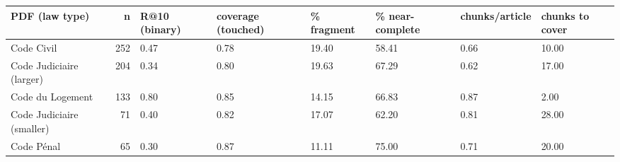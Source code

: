 \begin{tabular}{lrllllll}
\toprule
PDF (law type) & n & R@10 (binary) & coverage (touched) & \% fragment & \% near-complete & chunks/article & chunks to cover \\
\midrule
Code Civil & 252 & 0.47 & 0.78 & 19.40 & 58.41 & 0.66 & 10.00 \\
Code Judiciaire (larger) & 204 & 0.34 & 0.80 & 19.63 & 67.29 & 0.62 & 17.00 \\
Code du Logement & 133 & 0.80 & 0.85 & 14.15 & 66.83 & 0.87 & 2.00 \\
Code Judiciaire (smaller) & 71 & 0.40 & 0.82 & 17.07 & 62.20 & 0.81 & 28.00 \\
Code Pénal & 65 & 0.30 & 0.87 & 11.11 & 75.00 & 0.71 & 20.00 \\
\bottomrule
\end{tabular}

